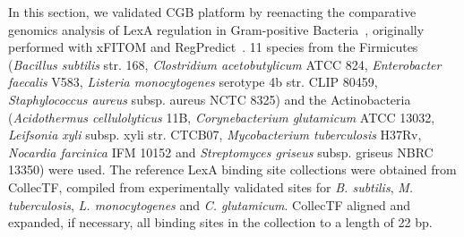 In this section, we validated CGB platform by reenacting the comparative
genomics analysis of LexA regulation in Gram-positive
Bacteria~\citep{cornish2012inference}, originally performed with xFITOM and
RegPredict~\citep{bhargava2010xfitom, novichkov2010regpredict}. 11 species from
the Firmicutes (\textit{Bacillus subtilis} str. 168, \textit{Clostridium
  acetobutylicum} ATCC 824, \textit{Enterobacter faecalis} V583,
\textit{Listeria monocytogenes} serotype 4b str. CLIP 80459,
\textit{Staphylococcus aureus} subsp. aureus NCTC 8325) and the Actinobacteria
(\textit{Acidothermus cellulolyticus} 11B, \textit{Corynebacterium glutamicum}
ATCC 13032, \textit{Leifsonia xyli} subsp. xyli str. CTCB07,
\textit{Mycobacterium tuberculosis} H37Rv, \textit{Nocardia farcinica} IFM
10152 and \textit{Streptomyces griseus} subsp. griseus NBRC 13350) were
used. The reference LexA binding site collections were obtained from CollecTF, compiled
from experimentally validated sites for \textit{B. subtilis},
\textit{M. tuberculosis}, \textit{L. monocytogenes} and
\textit{C. glutamicum}. CollecTF aligned and expanded, if necessary, all
binding sites in the collection to a length of 22 bp.

